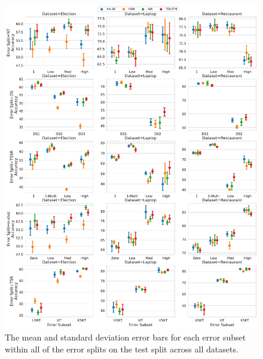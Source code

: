 \begin{figure}[h!]
    \centering
    \includegraphics[scale=0.43]{images/augmentation/methods_performance/baseline/test_error_subsets.pdf}
    \caption{The mean and standard deviation error bars for each error subset within all of the error splits on the test split across all datasets.}
    \label{fig:aug_baseline_test_error_subset}
\end{figure}

